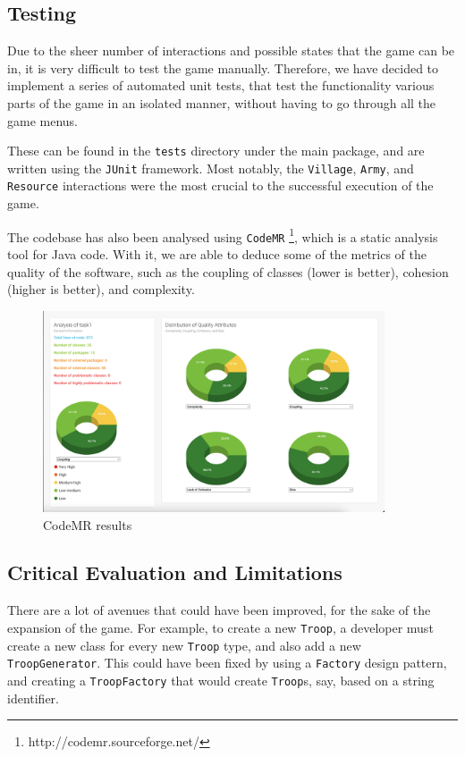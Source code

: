 \documentclass{article}
\newcommand{\code}[1]{\texttt{#1}}
\begin{document}
\newpage

\subsection{Testing}

Due to the sheer number of interactions and possible states that the game can be in, it is very difficult
to test the game manually. Therefore, we have decided to implement a series of automated unit tests, that
test the functionality various parts of the game in an isolated manner, without having to go through all the game menus.

These can be found in the \code{tests} directory under the main package, and are written using the
\code{JUnit} framework. Most notably, the \code{Village}, \code{Army}, and
\code{Resource} interactions were the most crucial to the successful execution
of the game.

The codebase has also been analysed using \code{CodeMR}
\footnote{http://codemr.sourceforge.net/}, which is a static analysis tool for
Java code. With it, we are able to deduce some of the metrics of the quality of the software,
such as the coupling of classes (lower is better), cohesion (higher is better), and complexity.

\begin{figure}[h]
    \centering
    \includegraphics[width=0.9\textwidth]{images/code_mr.png}
    \caption{CodeMR results}
    \label{fig:codemr}
\end{figure}


\subsection{Critical Evaluation and Limitations}

There are a lot of avenues that could have been improved, for the sake of the
expansion of the game. For example, to create a new \code{Troop}, a developer must create
a new class for every new \code{Troop} type, and also add a new \code{TroopGenerator}. This could have been 
fixed by using a \code{Factory} design pattern, and creating a \code{TroopFactory} that would
create \code{Troop}s, say, based on a string identifier.
\end{document}
